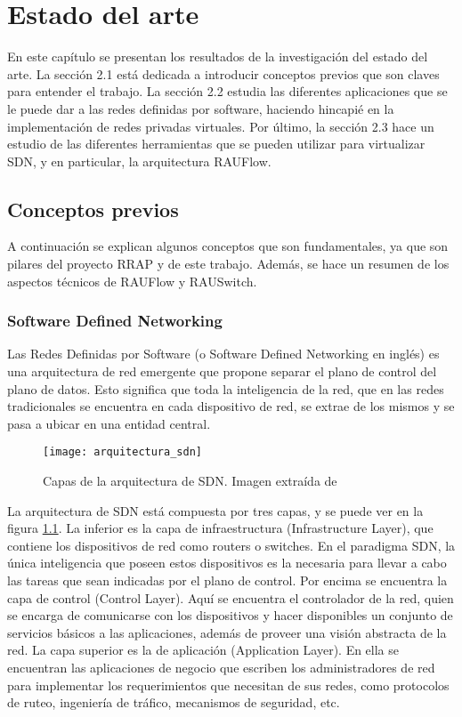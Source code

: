 \graphicspath{{Chapter2/Figs/}}

\chapter{Estado del arte}
En este capítulo se presentan los resultados de la investigación del estado del arte. La sección 2.1 está dedicada a introducir conceptos previos que son claves para entender el trabajo. La sección 2.2 estudia las diferentes aplicaciones que se le puede dar a las redes definidas por software, haciendo hincapié en la implementación de redes privadas virtuales. Por último, la sección 2.3 hace un estudio de las diferentes herramientas que se pueden utilizar para virtualizar SDN, y en particular, la arquitectura RAUFlow.

\section{Conceptos previos}
A continuación se explican algunos conceptos que son fundamentales, ya que son pilares del proyecto RRAP \cite{proyecto-rrap} y de este trabajo. Además, se hace un resumen de los aspectos técnicos de RAUFlow y RAUSwitch.

\subsection{Software Defined Networking}
Las Redes Definidas por Software (o Software Defined Networking en inglés) es una arquitectura de red emergente que propone separar el plano de control del plano de datos. Esto significa que toda la inteligencia de la red, que en las redes tradicionales se encuentra en cada dispositivo de red, se extrae de los mismos y se pasa a ubicar en una entidad central.

\begin{figure}[h] 
	\centering    
	\texttt{[image: arquitectura\_sdn]}
	\caption{Capas de la arquitectura de SDN. Imagen extraída de \cite{onf-def-sdn}}
	\label{fig:arquitectura_sdn}
\end{figure}

La arquitectura de SDN está compuesta por tres capas, y se puede ver en la figura \ref{fig:arquitectura_sdn}. La inferior es la capa de infraestructura (Infrastructure Layer), que contiene los dispositivos de red como routers o switches. En el paradigma SDN, la única inteligencia que poseen estos dispositivos es la necesaria para llevar a cabo las tareas que sean indicadas por el plano de control. Por encima se encuentra la capa de control (Control Layer). Aquí se encuentra el controlador de la red, quien se encarga de comunicarse con los dispositivos y hacer disponibles un conjunto de servicios básicos a las aplicaciones, además de proveer una visión abstracta de la red. La capa superior es la de aplicación (Application Layer). En ella se encuentran las aplicaciones de negocio que escriben los administradores de red para implementar los requerimientos que necesitan de sus redes, como protocolos de ruteo, ingeniería de tráfico, mecanismos de seguridad, etc.

